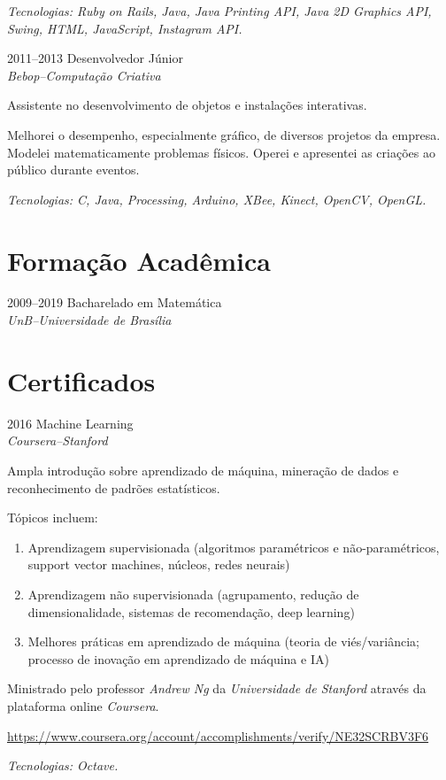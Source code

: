 \documentclass[a4paper]{simplecv}
\begin{document}
\begin{topic}
	{\em\scriptsize Tecnologias: Ruby on Rails, Java, Java Printing API,
	Java 2D Graphics API, Swing, HTML, JavaScript, Instagram API.}

\item[2011--2013] Desenvolvedor Júnior\\
	{\em\small Bebop--Computação Criativa}

	Assistente no desenvolvimento de objetos e instalações interativas.

	Melhorei o desempenho, especialmente gráfico, de diversos projetos da
	empresa. Modelei matematicamente problemas físicos. Operei e apresentei
	as criações ao público durante eventos.

	{\em\scriptsize Tecnologias: C, Java, Processing, Arduino, XBee,
	Kinect, OpenCV, OpenGL.}
\end{topic}

\section{Formação Acadêmica}

\begin{topic}
\item[2009--2019] Bacharelado em Matemática\\
	{\em\small UnB--Universidade de Brasília}

\end{topic}

\section{Certificados}

\begin{topic}
\item[2016] Machine Learning\\
	{\em\small Coursera--Stanford}

	Ampla introdução sobre aprendizado de máquina, mineração de dados e
	reconhecimento de padrões estatísticos.

	Tópicos incluem:
	\begin{enumerate}
		\item Aprendizagem supervisionada (algoritmos paramétricos e
			não-paramétricos, support vector machines, núcleos,
			redes neurais)

		\item Aprendizagem não supervisionada (agrupamento, redução de
			dimensionalidade, sistemas de recomendação, deep
			learning)

		\item Melhores práticas em aprendizado de máquina (teoria de
			viés/variância; processo de inovação em aprendizado de
			máquina e IA)
	\end{enumerate}

	Ministrado pelo professor \emph{Andrew Ng} da \emph{Universidade de
	Stanford} através da plataforma online \emph{Coursera}.

	{\scriptsize\url{https://www.coursera.org/account/accomplishments/verify/NE32SCRBV3F6}}

	{\em\scriptsize Tecnologias: Octave.}
\end{topic}
\end{document}
